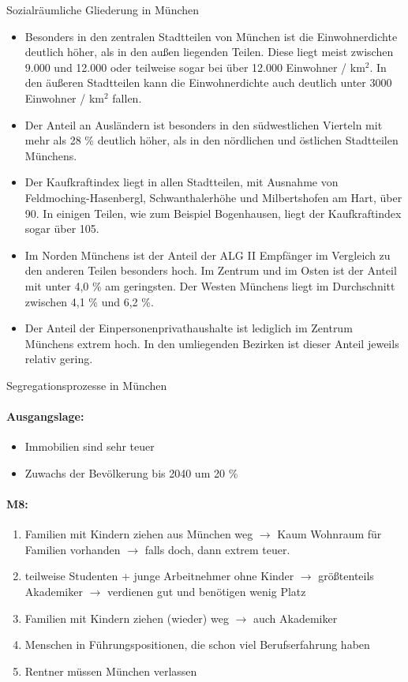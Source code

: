 \documentclass[12pt,a4paper]{report}
\begin{document}
	\noindent
	\Large
	Sozialräumliche Gliederung in München
	\large
	\begin{itemize}
		\item Besonders in den zentralen Stadtteilen von München ist die Einwohnerdichte deutlich höher, als in den außen liegenden Teilen.
		Diese liegt meist zwischen 9.000 und 12.000 oder teilweise sogar bei über 12.000 Einwohner / km$^2$.
		In den äußeren Stadtteilen kann die Einwohnerdichte auch deutlich unter 3000 Einwohner / km$^2$ fallen.
		\item Der Anteil an Ausländern ist besonders in den südwestlichen Vierteln mit mehr als 28 \% deutlich höher, als in den nördlichen und östlichen Stadtteilen Münchens.
		\item Der Kaufkraftindex liegt in allen Stadtteilen, mit Ausnahme von Feldmoching-Hasenbergl, Schwanthalerhöhe und Milbertshofen am Hart, über 90.
		In einigen Teilen, wie zum Beispiel Bogenhausen, liegt der Kaufkraftindex sogar über 105.
		\item Im Norden Münchens ist der Anteil der ALG II Empfänger im Vergleich zu den anderen Teilen besonders hoch.
		Im Zentrum und im Osten ist der Anteil mit unter 4,0 \% am geringsten.
		Der Westen Münchens liegt im Durchschnitt zwischen 4,1 \% und 6,2 \%.
		\item Der Anteil der Einpersonenprivathaushalte ist lediglich im Zentrum Münchens extrem hoch.
		In den umliegenden Bezirken ist dieser Anteil jeweils relativ gering.
	\end{itemize}
	\newpage
	\noindent
	\Large Segregationsprozesse in München
	\large
	\paragraph{Ausgangslage:}
	\begin{itemize}
		\item Immobilien sind sehr teuer
		\item Zuwachs der Bevölkerung bis 2040 um 20 \%
	\end{itemize}
	\paragraph{M8:}
	\begin{enumerate}
		\item Familien mit Kindern ziehen aus München weg $\to$ Kaum Wohnraum für Familien vorhanden $\to$ falls doch, dann extrem teuer.
		\item teilweise Studenten + junge Arbeitnehmer ohne Kinder $\to$ größtenteils Akademiker $\to$ verdienen gut und benötigen wenig Platz
		\item Familien mit Kindern ziehen (wieder) weg $\to$ auch Akademiker
		\item Menschen in Führungspositionen, die schon viel Berufserfahrung haben
		\item Rentner müssen München verlassen
	\end{enumerate}
\end{document}

